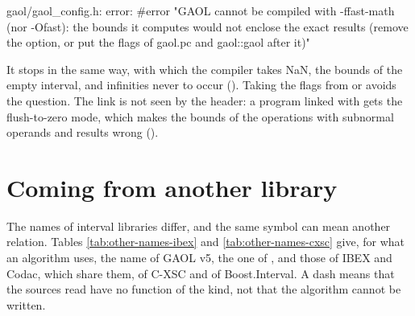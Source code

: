 \documentclass[12pt,a4paper,twoside,openright]{book}
\begin{document}
\begin{onscreen}
gaol/gaol_config.h: error: #error "GAOL cannot be
compiled with -ffast-math (nor -Ofast): the bounds it
computes would not enclose the exact results (remove
the option, or put the flags of gaol.pc and gaol::gaol
after it)"
\end{onscreen}

\noindent
It stops  in the same way, with which the compiler
takes NaN, the bounds of the empty interval, and infinities never to occur
(). Taking the flags from  or
 avoids the question. The link is not seen by the header: a
program linked with  gets the flush-to-zero mode, which makes
the bounds of the operations with subnormal operands and results wrong
().\newinvfive

\section{Coming from another library}\label{sec:other-libraries}
%
%
%
%
%
%

The names of interval libraries differ, and the same symbol can mean another
relation. Tables \ref{tab:other-names-ibex} and \ref{tab:other-names-cxsc}
give, for what an algorithm uses, the name of GAOL v5, the one of
, and those of IBEX and Codac, which share them, of
C-XSC and of Boost.Interval. A dash means that the sources read have no
function of the kind, not that the algorithm cannot be written.\newinvfive
\end{document}
